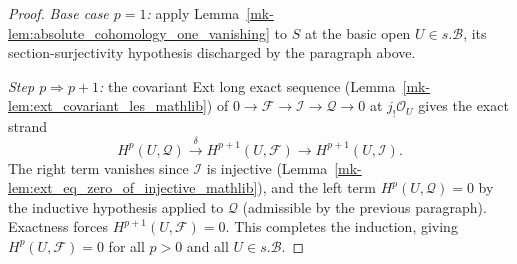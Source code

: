 \begin{proof}
  \emph{Base case \(p = 1\):} apply Lemma~\ref{mk-lem:absolute_cohomology_one_vanishing} to \(S\) at
  the basic open \(U \in s.\mathcal{B}\), its section-surjectivity hypothesis discharged by the
  paragraph above.

  \emph{Step \(p \Rightarrow p+1\):} the covariant Ext long exact sequence
  (Lemma~\ref{mk-lem:ext_covariant_les_mathlib}) of
  \(0 \to \mathcal{F} \to \mathcal{I} \to \mathcal{Q} \to 0\) at \(j_!\mathcal{O}_U\)
  gives the exact strand
  \[
    H^p(U, \mathcal{Q}) \xrightarrow{\ \delta\ } H^{p+1}(U, \mathcal{F}) \to
      H^{p+1}(U, \mathcal{I}).
  \]
  The right term vanishes since \(\mathcal{I}\) is injective
  (Lemma~\ref{mk-lem:ext_eq_zero_of_injective_mathlib}), and the left term
  \(H^p(U, \mathcal{Q}) = 0\) by the inductive hypothesis applied to \(\mathcal{Q}\)
  (admissible by the previous paragraph). Exactness forces
  \(H^{p+1}(U, \mathcal{F}) = 0\). This completes the induction, giving
  \(H^p(U, \mathcal{F}) = 0\) for all \(p > 0\) and all \(U \in s.\mathcal{B}\).
\end{proof}


